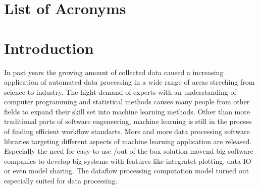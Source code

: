 \documentclass[english]{article}
\begin{document}
\section*{List of Acronyms}
\begin{acronym}
\end{acronym}

\section{Introduction}
In past years the growing amount of collected data caused a increasing application of automated data processing in a wide range of areas streching from  science to industry.
The hight demand of experts with an understanding of computer programming and statistical methods causes many people from other fields to expand their skill set into machine learning methods. Other than more traditional parts of software engeneering, machine learning is still in the process of finding efficient workflow standarts. More and more data processing software libraries targeting different aspects of machine learning application are released. Especially the need for easy-to-use /out-of-the-box solution movend big software companies to develop big systems with features like integratet plotting, data-IO or even model sharing. The dataflow processing computation model turned out especially suited for data processing.
\end{document}

